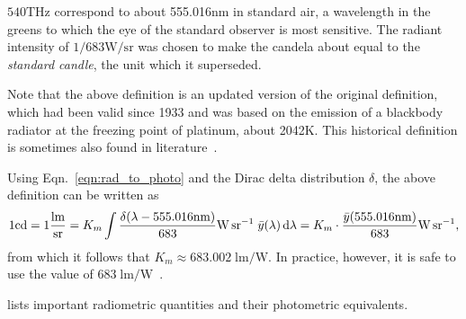 $\num{540}\unit{\tera\hertz}$ correspond to about \num{555.016}\unit{\nano\meter} in
standard air, a wavelength in the greens to which the eye of the standard observer
is most sensitive.
The radiant intensity of $1/683\unit{\watt\per\steradian}$ was chosen to make the candela about equal to the
\textit{standard candle}, the unit which it superseded. 

Note that the above definition is an updated version of the original definition, which had been
valid since 1933 and was based on the emission of a blackbody radiator
at the freezing point of platinum, about \num{2042}\unit{\kelvin}. This 
historical definition is sometimes also found in literature~\parencite{Meyer-Arendt:68}.

Using Eqn.~\eqref{eqn:rad_to_photo} and the Dirac delta distribution $\delta$, the
above definition can be written as
\begin{displaymath}
    1 \unit{\candela} = 1\frac{\unit{\lumen}}{\unit{\steradian}} 
    = K_m \int \frac{\delta(\lambda-555.016\unit{\nano\meter})}{683} \unit{\watt\per\steradian}\;\bar y(\lambda) \d\lambda
    = K_m \cdot \frac{\bar y(555.016\unit{\nano\meter})}{683}\unit{\watt\per\steradian},
\end{displaymath}
from which it follows that $K_m \approx 683.002 \;\unit{\lumen\per\watt}$. In 
practice, however, it is safe to use the value of $683\;\unit{\lumen\per\watt}$~\parencite{cie1996,wyszecki2000}.

 lists important radiometric quantities and their photometric equivalents.

